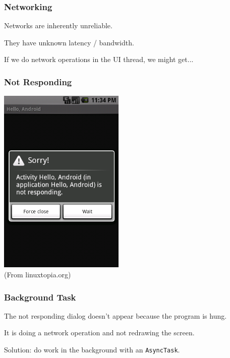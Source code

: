 \begin{frame}
\frametitle{Networking}

\begin{changemargin}{1cm}
Networks are inherently unreliable.

They have unknown latency / bandwidth.

If we do network operations in the UI thread, we might get...

\end{changemargin}
\end{frame}

\begin{frame}
\frametitle{Not Responding}
\begin{changemargin}{3cm}
\includegraphics[width=0.45\textwidth]{images/anr.png}\\
(From linuxtopia.org)
\end{changemargin}
\end{frame}

\begin{frame}
\frametitle{Background Task}

\begin{changemargin}{1cm}
The not responding dialog doesn't appear because the program is hung.

It is doing a network operation and not redrawing the screen.

Solution: do work in the background with an \texttt{AsyncTask}.

\end{changemargin}
\end{frame}


